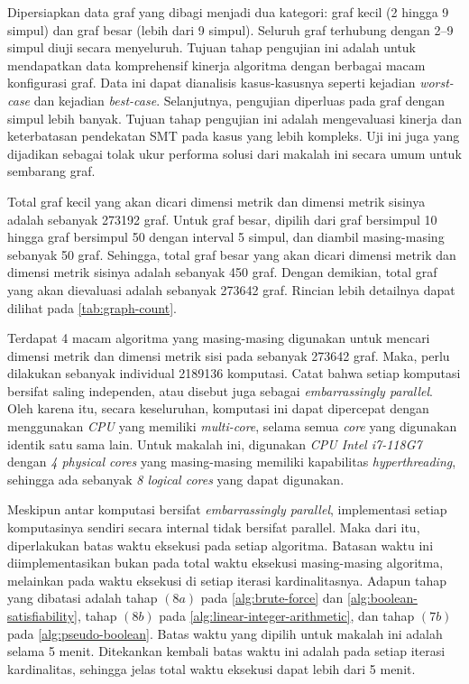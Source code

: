 \documentclass[10pt,twocolumn]{article}
\newcommand{\foreign}[1]{\foreignlanguage{english}{\textit{#1}}}
\newcommand{\minipagewidth}{\linewidth}
\begin{document}
Dipersiapkan data graf yang dibagi menjadi dua kategori: graf kecil (2 hingga 9 simpul) dan graf besar (lebih dari 9 simpul). Seluruh graf terhubung dengan 2–9 simpul diuji secara menyeluruh. Tujuan tahap pengujian ini adalah untuk mendapatkan data komprehensif kinerja algoritma dengan berbagai macam konfigurasi graf. Data ini dapat dianalisis kasus-kasusnya seperti kejadian \foreign{worst-case} dan kejadian \foreign{best-case}. Selanjutnya, pengujian diperluas pada graf dengan simpul lebih banyak. Tujuan tahap pengujian ini adalah mengevaluasi kinerja dan keterbatasan pendekatan SMT pada kasus yang lebih kompleks. Uji ini juga yang dijadikan sebagai tolak ukur performa solusi dari makalah ini secara umum untuk sembarang graf.

Total graf kecil yang akan dicari dimensi metrik dan dimensi metrik sisinya adalah sebanyak 273192 graf. Untuk graf besar, dipilih dari graf bersimpul 10 hingga graf bersimpul 50 dengan interval 5 simpul, dan diambil masing-masing sebanyak 50 graf. Sehingga, total graf besar yang akan dicari dimensi metrik dan dimensi metrik sisinya adalah sebanyak 450 graf. Dengan demikian, total graf yang akan dievaluasi adalah sebanyak 273642 graf. Rincian lebih detailnya dapat dilihat pada \autoref{tab:graph-count}.

\begin{center}
	\renewcommand{\minipagewidth}{\linewidth}
	
\end{center}

Terdapat 4 macam algoritma yang masing-masing digunakan untuk mencari dimensi metrik dan dimensi metrik sisi pada sebanyak 273642 graf. Maka, perlu dilakukan sebanyak individual 2189136 komputasi. Catat bahwa setiap komputasi bersifat saling independen, atau disebut juga sebagai \foreign{embarrassingly parallel}. Oleh karena itu, secara keseluruhan, komputasi ini dapat dipercepat dengan menggunakan \foreign{CPU} yang memiliki \foreign{multi-core}, selama semua \foreign{core} yang digunakan identik satu sama lain. Untuk makalah ini, digunakan \foreign{CPU Intel i7-118G7} dengan \foreign{4 physical cores} yang masing-masing memiliki kapabilitas \foreign{hyperthreading}, sehingga ada sebanyak \foreign{8 logical cores} yang dapat digunakan.

Meskipun antar komputasi bersifat \foreign{embarrassingly parallel}, implementasi setiap komputasinya sendiri secara internal tidak bersifat parallel. Maka dari itu, diperlakukan batas waktu eksekusi pada setiap algoritma. Batasan waktu ini diimplementasikan bukan pada total waktu eksekusi masing-masing algoritma, melainkan pada waktu eksekusi di setiap iterasi kardinalitasnya. Adapun tahap yang dibatasi adalah tahap \((8a)\) pada \autoref{alg:brute-force} dan \autoref{alg:boolean-satisfiability}, tahap \((8b)\) pada \autoref{alg:linear-integer-arithmetic}, dan tahap \((7b)\) pada \autoref{alg:pseudo-boolean}. Batas waktu yang dipilih untuk makalah ini adalah selama 5 menit. Ditekankan kembali batas waktu ini adalah pada setiap iterasi kardinalitas, sehingga jelas total waktu eksekusi dapat lebih dari 5 menit.
\end{document}
